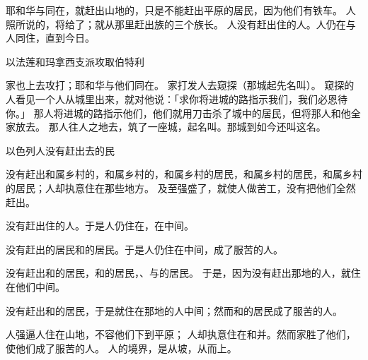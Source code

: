 {耶和华与{}同在，{}就赶出山地的{}，只是不能赶出平原的居民，因为他们有铁车。
人照{}所说的，将{}给了{}；{}就从那里赶出{}族的三个族长。
人没有赶出住{}的{}人。{}人仍在{}与{}人同住，直到今日。
\par }{\SH 以法莲和玛拿西支派攻取伯特利
\par }{\PP {}家也上去攻打{}；耶和华与他们同在。
家打发人去窥探{}（那城起先名叫{}）。
窥探的人看见一个人从城里出来，就对他说：「求你将进城的路指示我们，我们必恩待你。」
那人将进城的路指示他们，他们就用刀击杀了城中的居民，但将那人和他全家放去。
那人往{}人之地去，筑了一座城，起名叫{}。那城到如今还叫这名。
\par }{\SH 以色列人没有赶出去的民
\par }{\PP {}没有赶出{}和属{}乡村的{}，{}和属{}乡村的{}，{}和属{}乡村的居民，{}和属{}乡村的居民，{}和属{}乡村的居民；{}人却执意住在那些地方。
及至{}强盛了，就使{}人做苦工，没有把他们全然赶出。
\par }{\PP {}没有赶出住{}的{}人。于是{}人仍住在{}，在{}中间。
\par }{\PP {}没有赶出{}的居民和{}的居民。于是{}人仍住在{}中间，成了服苦的人。
\par }{\PP {}没有赶出{}和{}的居民，{}和{}的居民，{}、{}与{}的居民。
于是，{}因为没有赶出那地的{}人，就住在他们中间。
\par }{\PP {}没有赶出{}和{}的居民，于是{}就住在那地的{}人中间；然而{}和{}的居民成了服苦的人。
\par }{\PP {}人强逼{}人住在山地，不容他们下到平原；
人却执意住在{}和{}并{}。然而{}家胜了他们，使他们成了服苦的人。
人的境界，是从{}坡，从{}而上。

}
